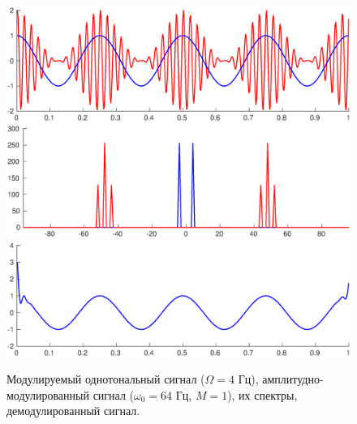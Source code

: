 \documentclass[a4paper,14pt]{extarticle}
\begin{document}
\begin{figure}[p]
\centering
\includegraphics[width=1\textwidth]{ammod_m1.eps}
\includegraphics[width=1\textwidth]{ammod_s_m1.eps}
\includegraphics[width=1\textwidth]{amdemod_m1.eps}
\captionsetup{justification=centering,margin=0.5cm}
\caption{Модулируемый однотональный сигнал ($\Omega = 4$ Гц), амплитудно-модулированный сигнал ($\omega_0 = 64$ Гц, $M = 1$), их спектры, демодулированный сигнал.}
\label{am1}
\end{figure}
\end{document}
